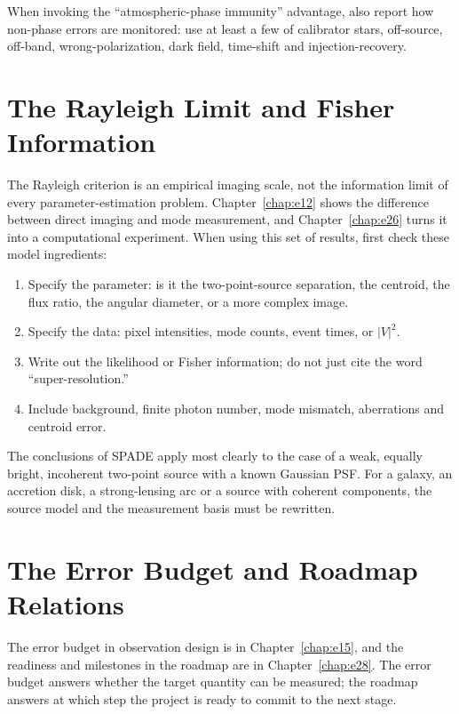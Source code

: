 When invoking the ``atmospheric-phase immunity'' advantage, also report how non-phase errors are monitored: use at least a few of calibrator stars, off-source, off-band, wrong-polarization, dark field, time-shift and injection-recovery.

\section{The Rayleigh Limit and Fisher Information}
\label{appsec:d-rayleigh}

The Rayleigh criterion is an empirical imaging scale, not the information limit of every parameter-estimation problem. Chapter~\ref{chap:e12} shows the difference between direct imaging and mode measurement, and Chapter~\ref{chap:e26} turns it into a computational experiment. When using this set of results, first check these model ingredients:

\begin{enumerate}[leftmargin=*]
\item Specify the parameter: is it the two-point-source separation, the centroid, the flux ratio, the angular diameter, or a more complex image.
\item Specify the data: pixel intensities, mode counts, event times, or \(|V|^2\).
\item Write out the likelihood or Fisher information; do not just cite the word ``super-resolution.''
\item Include background, finite photon number, mode mismatch, aberrations and centroid error.
\end{enumerate}

The conclusions of SPADE apply most clearly to the case of a weak, equally bright, incoherent two-point source with a known Gaussian PSF. For a galaxy, an accretion disk, a strong-lensing arc or a source with coherent components, the source model and the measurement basis must be rewritten.

\section{The Error Budget and Roadmap Relations}
\label{appsec:d-error-budget}

The error budget in observation design is in Chapter~\ref{chap:e15}, and the readiness and milestones in the roadmap are in Chapter~\ref{chap:e28}. The error budget answers whether the target quantity can be measured; the roadmap answers at which step the project is ready to commit to the next stage.

